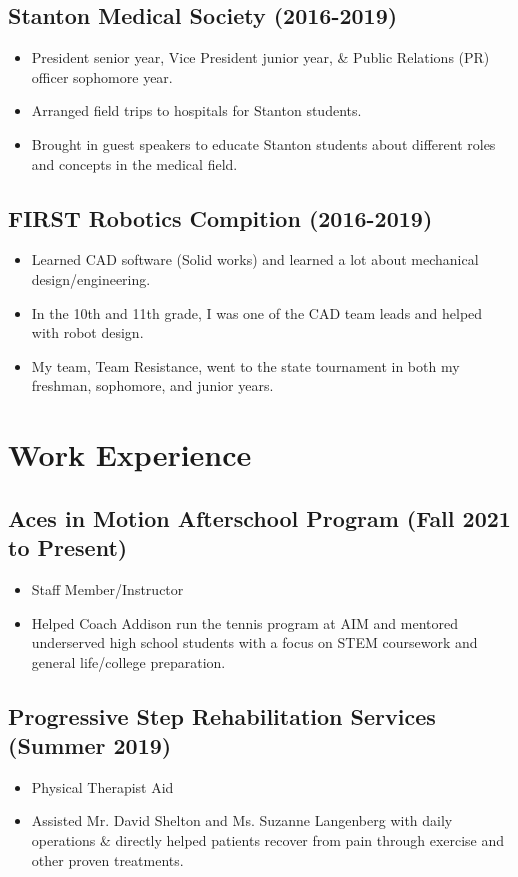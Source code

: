 \documentclass{article}
\newcommand{\sectionspacing}{\vspace{-.2em}} %
\newenvironment{CustomItemize}
{ \begin{itemize}[leftmargin=1em]
    \setlength{\itemsep}{0pt}
    \setlength{\parskip}{0pt}
    \setlength{\parindent}{0pt}
    \setlength{\parsep}{0pt}     }
{ \end{itemize}                  }
\begin{document}
\subsection{Stanton Medical Society (2016-2019)}
\begin{CustomItemize}
\item President senior year, Vice President junior year, \& Public Relations (PR) officer sophomore year.
\item Arranged field trips to hospitals for Stanton students.
\item Brought in guest speakers to educate Stanton students about different roles and concepts in the medical field. 
\end{CustomItemize}

\subsection{FIRST Robotics Compition (2016-2019)}
\begin{CustomItemize}
\item Learned CAD software (Solid works) and learned a lot about mechanical design/engineering.
\item In the 10th and 11th grade, I was one of the CAD team leads and helped with robot design.
\item My team, Team Resistance, went to the state tournament in both my freshman, sophomore, and junior years. 
\end{CustomItemize}

\sectionspacing{}

\section{Work Experience}
\subsection{Aces in Motion Afterschool Program (Fall 2021 to Present)}
\begin{CustomItemize}
\item Staff Member/Instructor
\item Helped Coach Addison run the tennis program at AIM and mentored underserved high school students with a focus on STEM coursework and general life/college preparation.
\end{CustomItemize}

\subsection{Progressive Step Rehabilitation Services (Summer 2019)}
\begin{CustomItemize}
\item Physical Therapist Aid
\item Assisted Mr. David Shelton and Ms. Suzanne Langenberg with daily operations \& directly helped patients recover from pain through exercise and other proven treatments.
\end{CustomItemize}
\end{document}
